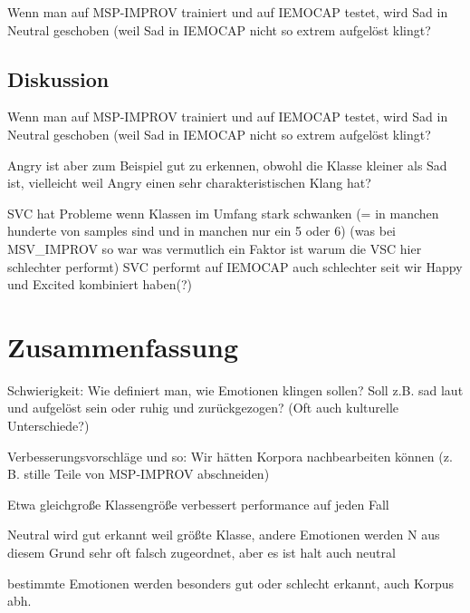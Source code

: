 \documentclass{article} %
\begin{document}
Wenn man auf MSP-IMPROV trainiert und auf IEMOCAP testet, wird Sad in Neutral geschoben (weil Sad in IEMOCAP nicht so extrem aufgelöst klingt?

\subsection{Diskussion}

Wenn man auf MSP-IMPROV trainiert und auf IEMOCAP testet, wird Sad in Neutral geschoben (weil Sad in IEMOCAP nicht so extrem aufgelöst klingt?

Angry ist aber zum Beispiel gut zu erkennen, obwohl die Klasse kleiner als Sad ist, vielleicht weil Angry einen sehr charakteristischen Klang hat?

SVC hat Probleme wenn Klassen im Umfang stark schwanken (= in manchen hunderte von samples sind und in manchen nur ein 5 oder 6) (was bei MSV_IMPROV so war was vermutlich ein Faktor ist warum die VSC hier schlechter performt)
SVC performt auf IEMOCAP auch schlechter seit wir Happy und Excited kombiniert haben(?)

\section{Zusammenfassung}

Schwierigkeit: Wie definiert man, wie Emotionen klingen sollen? Soll z.B. sad laut und aufgelöst sein oder ruhig und zurückgezogen? (Oft auch kulturelle Unterschiede?)

Verbesserungsvorschläge und so: Wir hätten Korpora nachbearbeiten können (z. B. stille Teile von MSP-IMPROV abschneiden)

Etwa gleichgroße Klassengröße verbessert performance auf jeden Fall

Neutral wird gut erkannt weil größte Klasse, andere Emotionen werden N aus diesem Grund sehr oft falsch zugeordnet, aber es ist halt auch neutral

bestimmte Emotionen werden besonders gut oder schlecht erkannt, auch Korpus abh.

\pagebreak
\tableofcontents
\pagebreak


\end{document}

